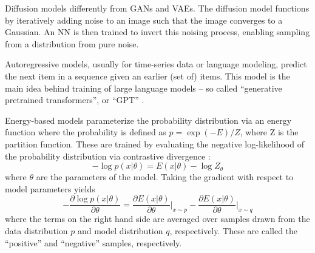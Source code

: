 Diffusion models \cite{ho_denoising_2020} differently from GANs and VAEs. The diffusion model functions by iteratively adding noise to an image such that the image converges to a Gaussian. An NN is then trained to invert this noising process, enabling sampling from a distribution from pure noise. 

Autoregressive models, usually for time-series data or language modeling, predict the next item in a sequence given an earlier (set of) items. This model is the main idea behind training of large language models -- so called ``generative pretrained transformers'', or ``GPT'' \cite{radford_improving_2018}. 

Energy-based models parameterize the probability distribution via an energy function where the probability is defined as $p =\exp(-E) / Z$, where Z is the partition function. These are trained by evaluating the negative log-likelihood of the probability distribution via contrastive divergence \cite{hinton_training_2002, ruslan_deep_2009, tieleman_training_2008}: 
\begin{equation}
	- \log p(x\vert \theta) = E(x \vert \theta) - \log Z_\theta
\end{equation}
where $\theta$ are the parameters of the model. Taking the gradient with respect to model parameters yields 
\begin{equation}
	 - \frac{\partial \log p(x\vert \theta)}{\partial \theta} = \frac{\partial E(x \vert \theta)}{\partial \theta} \bigg \rvert_{x \sim p} - \frac{\partial E(x \vert \theta)}{\partial \theta} \bigg \rvert_{x \sim q}
\end{equation}
where the terms on the right hand side are averaged over samples drawn from the data distribution $p$ and model distribution $q$, respectively. These are called the ``positive'' and ``negative'' samples, respectively.






























